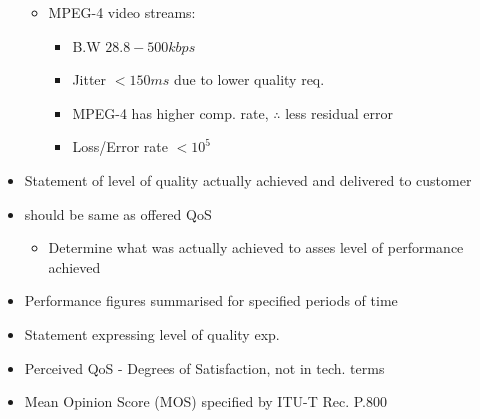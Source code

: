 \documentclass[a4paper]{article}
\begin{document}
\begin{itemize}
\begin{itemize}
\begin{itemize}
		\end{itemize}
		\item MPEG-4 video streams:
		\begin{itemize}
			\item B.W $28.8-500kbps$ 
			\item Jitter $<150ms$ due to lower quality req.
			\item MPEG-4 has higher comp. rate, $\therefore$ less
				residual error
			\item Loss/Error rate $<10^5$
		\end{itemize}
	\end{itemize}
	\item Statement of level of quality actually achieved and delivered to
		customer
	\item should be same as offered QoS
	\begin{itemize}
		\item Determine what was actually achieved to asses level of
			performance achieved		
	\end{itemize}
	\item Performance figures summarised for specified periods of time
\end{itemize}
\begin{itemize}
	\item Statement expressing level of quality exp.
	\item Perceived QoS - Degrees of Satisfaction, not in tech. terms
	\item Mean Opinion Score (MOS) specified by ITU-T Rec. P.800
\end{itemize}
\end{document}
